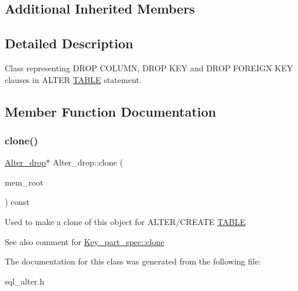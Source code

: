 \subsection*{Additional Inherited Members}


\subsection{Detailed Description}
Class representing D\+R\+OP C\+O\+L\+U\+MN, D\+R\+OP K\+EY and D\+R\+OP F\+O\+R\+E\+I\+GN K\+EY clauses in A\+L\+T\+ER \mbox{\hyperlink{structTABLE}{T\+A\+B\+LE}} statement. 

\subsection{Member Function Documentation}
\mbox{\label{classAlter__drop_ae277011b26cca8a7451338793b3e1291}} 
\subsubsection{\texorpdfstring{clone()}{clone()}}
{\footnotesize\ttfamily \mbox{\hyperlink{classAlter__drop}{Alter\+\_\+drop}}$\ast$ Alter\+\_\+drop\+::clone (\begin{DoxyParamCaption}\item[{M\+E\+M\+\_\+\+R\+O\+OT $\ast$}]{mem\+\_\+root }\end{DoxyParamCaption}) const\hspace{0.3cm}{\ttfamily [inline]}}

Used to make a clone of this object for A\+L\+T\+E\+R/\+C\+R\+E\+A\+TE \mbox{\hyperlink{structTABLE}{T\+A\+B\+LE}} \begin{DoxySeeAlso}{See also}
comment for \mbox{\hyperlink{classKey__part__spec_adf40542629144b3dc70f9ae4b4b27c78}{Key\+\_\+part\+\_\+spec\+::clone}} 
\end{DoxySeeAlso}


The documentation for this class was generated from the following file\+:\begin{DoxyCompactItemize}
\item 
sql\+\_\+alter.\+h\end{DoxyCompactItemize}
